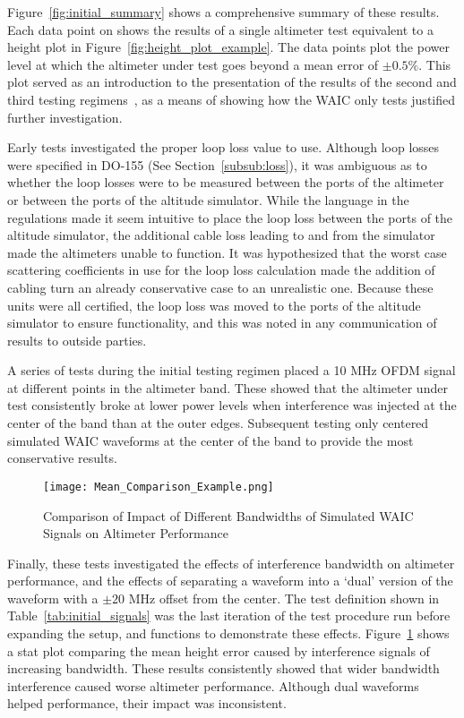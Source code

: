 Figure~\ref{fig:initial_summary} shows a comprehensive summary of these results. Each data point on shows the results of a single altimeter test equivalent to a height plot in Figure~\ref{fig:height_plot_example}. The data points plot the power level at which the altimeter under test goes beyond a mean error of $\pm0.5\%$. This plot served as an introduction to the presentation of the results of the second and third testing regimens~\cite{uwe_radio_2019}, as a means of showing how the WAIC only tests justified further investigation. 

Early tests investigated the proper loop loss value to use. Although loop losses were specified in DO-155 (See Section~\ref{subsub:loss}), it was ambiguous as to whether the loop losses were to be measured between the ports of the altimeter or between the ports of the altitude simulator. While the language in the regulations made it seem intuitive to place the loop loss between the ports of the altitude simulator, the additional cable loss leading to and from the simulator made the altimeters unable to function. It was hypothesized that the worst case scattering coefficients in use for the loop loss calculation made the addition of cabling turn an already conservative case to an unrealistic one. Because these units were all certified, the loop loss was moved to the ports of the altitude simulator to ensure functionality, and this was noted in any communication of results to outside parties.

A series of tests during the initial testing regimen placed a 10 MHz OFDM signal at different points in the altimeter band. These showed that the altimeter under test consistently broke at lower power levels when interference was injected at the center of the band than at the outer edges. Subsequent testing only centered simulated WAIC waveforms at the center of the band to provide the most conservative results. 
\begin{figure}[h!]
	\centering
	\texttt{[image: Mean\_Comparison\_Example.png]}
	\caption{Comparison of Impact of Different Bandwidths of Simulated WAIC Signals on Altimeter Performance}
	\label{fig:mean_comparison}
\end{figure}
Finally, these tests investigated the effects of interference bandwidth on altimeter performance, and the effects of separating a waveform into a `dual' version of the waveform with a $\pm20$ MHz offset from the center. The test definition shown in Table~\ref{tab:initial_signals} was the last iteration of the test procedure run before expanding the setup, and functions to demonstrate these effects. Figure~\ref{fig:mean_comparison} shows a stat plot comparing the mean height error caused by interference signals of increasing bandwidth. These results consistently showed that wider bandwidth interference caused worse altimeter performance. Although dual waveforms helped performance, their impact was inconsistent.  

